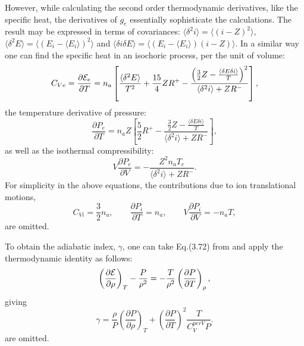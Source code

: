 However, while calculating the second order thermodynamic derivatives, like the specific heat, the derivatives of $g_e$ essentially sophisticate the 
calculations. The result may be expressed in terms of covariances: $\langle\delta^2i\rangle=\langle(i-Z)^2\rangle$, $\langle\delta^2E\rangle=\langle(E_i-\langle E_i\rangle)^2 \rangle$ and 
$\langle\delta i\delta E\rangle=\langle(E_i-\langle E_i\rangle)(i-Z)\rangle$. In a similar way one can find the specific heat in an isochoric process, per the unit of volume:
\begin{equation}
C_{Ve}=\frac{\partial {\cal E}_e}{\partial T}=n_a\left[\frac{\langle\delta^2E\rangle}{T^2}+\frac{15}4ZR^+
-\frac{\left(\frac32Z-\frac{\langle\delta E\delta i\rangle}T\right)^2}{\langle\delta^2i\rangle+ZR^-}\right],
\end{equation}
the temperature derivative of pressure:
\begin{equation}
\frac {\partial P_e}{\partial T}=n_aZ\left[\frac52 R^+ -\frac{\frac32Z-\frac{\langle\delta E\delta i\rangle}T}{\langle\delta^2i\rangle+ZR^-}\right],
\end{equation}
as well as the isothermal compressibility:
\begin{equation}
V\frac{\partial P_e}{\partial V}=-\frac{Z^2n_aT_e}{\langle\delta^2i\rangle+ZR^-}.
\end{equation}
For simplicity in the above equations, the contributions due to ion translational motions,
\begin{equation}
C_{Vi}=\frac32n_a, \qquad
\frac{\partial P_i}{\partial T}=n_a, \qquad
V\frac{\partial P_i}{\partial V}=-n_aT,
\end{equation}
are omitted.

To obtain the adiabatic index, $\gamma$, one can take Eq.(3.72) from \cite{drake} and apply
the thermodynamic identity as follows:
\begin{equation}
\left( \frac{\partial {\cal E}}{\partial \rho} \right)_{T} - \frac{P}{\rho^2} =
-\frac{T}{\rho^2} \left( \frac{\partial P}{\partial T} \right)_{\rho},
\end{equation}
giving
\begin{equation}
\gamma = \frac{\rho}{P} \left( \frac{\partial P}{\partial \rho} \right)_T +
\left( \frac{\partial P}{\partial T} \right)^2 \frac{T}{C_V^{per V} P}.
\end{equation}
are omitted.

